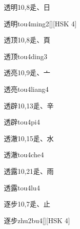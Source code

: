 \begin{entry}{透明}{10,8}{⾡、⽇}
  \begin{phonetics}{透明}{tou4ming2}[][HSK 4]
  \end{phonetics}
\end{entry}

\begin{entry}{透顶}{10,8}{⾡、⾴}
  \begin{phonetics}{透顶}{tou4ding3}
  \end{phonetics}
\end{entry}

\begin{entry}{透亮}{10,9}{⾡、⼇}
  \begin{phonetics}{透亮}{tou4liang4}
  \end{phonetics}
\end{entry}

\begin{entry}{透辟}{10,13}{⾡、⾟}
  \begin{phonetics}{透辟}{tou4pi4}
  \end{phonetics}
\end{entry}

\begin{entry}{透澈}{10,15}{⾡、⽔}
  \begin{phonetics}{透澈}{tou4che4}
  \end{phonetics}
\end{entry}

\begin{entry}{透露}{10,21}{⾡、⾬}
  \begin{phonetics}{透露}{tou4lu4}
  \end{phonetics}
\end{entry}

\begin{entry}{逐步}{10,7}{⾡、⽌}
  \begin{phonetics}{逐步}{zhu2bu4}[][HSK 4]
  \end{phonetics}
\end{entry}

